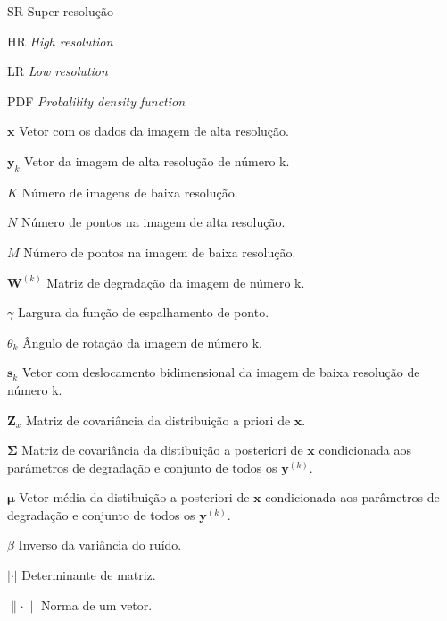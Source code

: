 \documentclass[12pt,openright,oneside,a4paper,english,brazil]{abntex2}
\begin{document}
\begin{siglas}
	\item[SR] Super-resolução
	\item[HR] \emph{High resolution}
	\item[LR] \emph{Low resolution}
	\item[PDF] \emph{Probalility density function}

\end{siglas}

\begin{simbolos}
	\item[$ \mathbf{x} $] Vetor com os dados da imagem de alta resolução.
	\item[$ \mathbf{y}_k $] Vetor da imagem de alta resolução de número k.
	\item[$ K $] Número de imagens de baixa resolução.
	\item[$ N $] Número de pontos na imagem de alta resolução.
    \item[$ M $] Número de pontos na imagem de baixa resolução.
    \item[$ \mathbf{W}^{(k)}$] Matriz de degradação da imagem de número k.
    \item[$ \gamma $] Largura da função de espalhamento de ponto.
    \item[$ \theta_k $] Ângulo de rotação da imagem de número k.
    \item[$ \mathbf{s}_k $] Vetor com deslocamento bidimensional da imagem de baixa resolução de número k.
    \item[$ \mathbf{Z}_x $] Matriz de covariância da distribuição a priori de $\mathbf{x}$.
    \item[$ \mathbf{\Sigma}$] Matriz de covariância da distibuição a posteriori de $\mathbf{x}$ condicionada aos parâmetros de degradação e conjunto de todos os $\mathbf{y}^{(k)}$.
    \item[$ \boldsymbol{\mu} $] Vetor média da distibuição a posteriori de $\mathbf{x}$ condicionada aos parâmetros de degradação e conjunto de todos os $\mathbf{y}^{(k)}$.
    \item[$ \beta $] Inverso da variância do ruído.
    \item[$ | \cdot | $] Determinante de matriz.
    \item[$\| \cdot \|$] Norma de um vetor.
    
\end{simbolos}

\tableofcontents*
\cleardoublepage



\textual








\postextual



\end{document}
